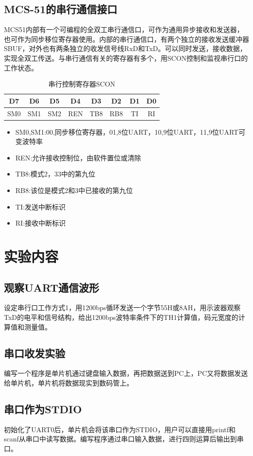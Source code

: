 \documentclass{article}
\begin{document}
\begin{CJK}{UTF8}{gkai}
\subsection{MCS-51的串行通信接口}
MCS51内部有一个可编程的全双工串行通信口，可作为通用异步接收和发送器，也可作为同步移位寄存器使用。内部的串行通信口，有两个独立的接收发送缓冲器SBUF，对外也有两条独立的收发信号线RxD和TxD。可以同时发送，接收数据，实现全双工传送。与串行通信有关的寄存器有多个，用SCON控制和监视串行口的工作状态。
\begin{table}
  \centering
  \caption{串行控制寄存器SCON}
  \begin{tabular}{|c|c|c|c|c|c|c|c|}
    \hline
    D7&D6&D5&D4&D3&D2&D1&D0\\
    \hline
    SM0&SM1&SM2&REN&TB8&RB8&TI&RI\\
    \hline
  \end{tabular}
\end{table}
\begin{itemize}
  \item SM0,SM1:00,同步移位寄存器，01,8位UART，10,9位UART，11,9位UART可变波特率
  \item REN:允许接收控制位，由软件置位或清除
  \item TB8:模式2，33中的第九位
  \item RB8:该位是模式2和3中已接收的第九位
  \item TI:发送中断标识
  \item RI:接收中断标识
\end{itemize}
\section{实验内容}
\subsection{观察UART通信波形}
设定串行口工作方式1，用1200bps循环发送一个字节55H或8AH，用示波器观察TxD的电平和信号结构，给出1200bps波特率条件下的TH1计算值，码元宽度的计算值和测量值。
\subsection{串口收发实验}
编写一个程序是单片机通过键盘输入数据，再把数据送到PC上，PC又将数据发送给单片机，单片机将数据现实到数码管上。
\subsection{串口作为STDIO}
初始化了UART0后，单片机会将该串口作为STDIO，用户可以直接用printf和scanf从串口中读写数据。编写程序通过串口输入数据，进行四则运算后输出到串口。

\end{CJK}
\end{document}
